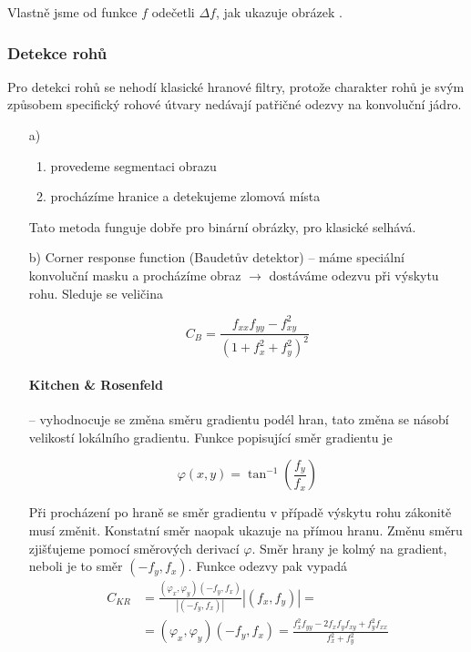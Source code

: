 Vlastně jsme od funkce $f$ odečetli $\Delta f$, jak ukazuje obrázek .


\subsubsection{Detekce rohů}
Pro detekci rohů se nehodí klasické hranové filtry, protože charakter rohů je svým způsobem
specifický rohové útvary nedávají patřičné odezvy na konvoluční jádro.


\begin{itemize}
\item[a)]
\begin{enumerate}
\item provedeme segmentaci obrazu
\item procházíme hranice a detekujeme zlomová místa
\end{enumerate}
Tato metoda funguje dobře pro binární obrázky, pro klasické selhává.
\item[b)] Corner response function (Baudetův detektor) -- 
máme speciální konvoluční masku a procházíme obraz $\rightarrow$ 
dostáváme odezvu při výskytu rohu. Sleduje se veličina 

\begin{equation}
C_B=\frac{f_{xx}f_{yy}-f_{xy}^2}{(1+f_x^2+f_y^2)^2}
\end{equation}

\paragraph{Kitchen \& Rosenfeld} -- vyhodnocuje se změna směru gradientu podél hran, tato změna se násobí 
velikostí lokálního gradientu. Funkce popisující směr gradientu je

\begin{equation}
\varphi(x,y)=\tan^{-1}\left(\frac{f_y}{f_x}\right)
\end{equation}

Při procházení po hraně se směr gradientu v případě výskytu rohu zákonitě musí změnit. Konstatní směr naopak
ukazuje na přímou hranu. Změnu směru zjišťujeme pomocí směrových derivací $\varphi$. Směr hrany je kolmý na gradient,
neboli je to směr $(-f_y,f_x)$. Funkce odezvy pak vypadá
\begin{align}
C_{KR} &= \frac{(\varphi_x,\varphi_y)(-f_y,f_x)}{\left|(-f_y,f_x)\right|}\left|(f_x,f_y)\right|=\nonumber\\
 &= (\varphi_x,\varphi_y)(-f_y,f_x)=\frac{f^2_xf_{yy}-2f_xf_yf_{xy}+f_y^2f_{xx}}{f_x^2+f_y^2}
\end{align}


\end{itemize}
